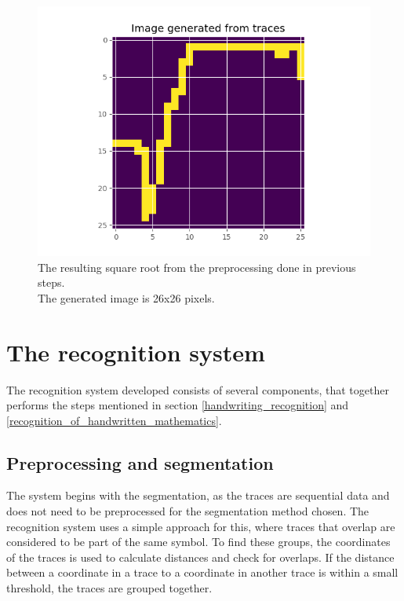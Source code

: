 \begin{figure}[H]
    \centering
    \includegraphics[width=\linewidth,keepaspectratio]{Assets/Chapter3_Method/sqrt_image.png}
    \caption{The resulting square root from the preprocessing done in previous steps.\\The generated image is 26x26 pixels.}
    \label{fig:sqrt_img}
\end{figure}

\section{The recognition system}
\label{the_recognintion_system}
The recognition system developed consists of several components, that together performs the steps mentioned in section \ref{handwriting_recognition} and \ref{recognition_of_handwritten_mathematics}. 


\subsection{Preprocessing and segmentation}
\label{preprocessing_and_segmentation}

The system begins with the segmentation, as the traces are sequential data and does not need to be preprocessed for the segmentation method chosen. The recognition system uses a simple approach for this, where traces that overlap are considered to be part of the same symbol. To find these groups, the coordinates of the traces is used to calculate distances and check for overlaps. If the distance between a coordinate in a trace to a coordinate in another trace is within a small threshold, the traces are grouped together.

